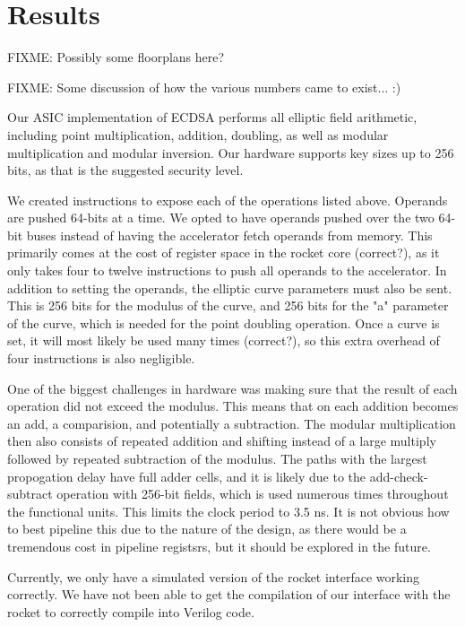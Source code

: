 \documentclass[twocolumn]{article}
\begin{document}
\section{Results}

FIXME: Possibly some floorplans here?

FIXME: Some discussion of how the various numbers came to exist... :)

Our ASIC implementation of ECDSA performs all elliptic field arithmetic,
including point multiplication, addition, doubling, as well as modular
multiplication and modular inversion. Our hardware supports key sizes
up to 256 bits, as that is the suggested security level.

We created instructions to expose each of the operations listed above. Operands
are pushed 64-bits at a time. We opted to have operands pushed over the two 64-bit
buses instead of having the accelerator fetch operands from memory. This primarily 
comes at the cost of register space in the rocket core (correct?), as it only takes 
four to twelve instructions to push all operands to the accelerator. In addition to 
setting the operands, the elliptic curve parameters must also be sent. This is 256 bits
for the modulus of the curve, and 256 bits for the "a" parameter of the curve, which
is needed for the point doubling operation. Once a curve is set, it will most likely
be used many times (correct?), so this extra overhead of four instructions is also 
negligible. 

One of the biggest challenges in hardware was making sure that the result of each 
operation did not exceed the modulus. This means that on each addition becomes an 
add, a comparision, and potentially a subtraction. The modular multiplication then 
also consists of repeated addition and shifting instead of a large multiply followed
by repeated subtraction of the modulus. The paths with the largest propogation delay
have full adder cells, and it is likely due to the add-check-subtract operation with 
256-bit fields, which is used numerous times throughout the functional units. This 
limits the clock period to 3.5 ns. It is not obvious how to best pipeline this due 
to the nature of the design, as there would be a tremendous cost in pipeline registsrs, 
but it should be explored in the future. 

Currently, we only have a simulated version of the rocket interface working correctly. 
We have not been able to get the compilation of our interface with the rocket to correctly
compile into Verilog code. 
\end{document}
